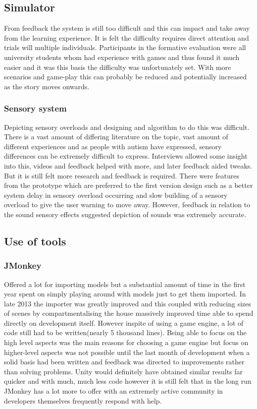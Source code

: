 \subsection{Simulator}
From feedback the system is still too difficult and this can impact and take away from the learning experience. It is felt the difficulty requires direct attention and trials will multiple individuals. Participants in the formative evaluation were all university students whom had experience with games and thus found it much easier and it was this basis the difficulty was unfortunately set. With more scenarios and game-play this can probably be reduced and potentially increased as the story moves onwards.
 
\subsubsection{Sensory system}
Depicting sensory overloads and designing and algorithm to do this was difficult. There is a vast amount of differing literature on the topic, vast amount of different experiences and as people with autism have expressed, sensory differences can be extremely difficult to express. Interviews allowed some insight into this, videos and feedback helped with more, and later feedback aided tweaks. But it is still felt more research and feedback is required. There were features from the prototype which are preferred to the first version design such as a better system delay in sensory overload occurring and slow building of a sensory overload to give the user warning to move away. However, feedback in relation to the sound sensory effects suggested depiction of sounds was extremely accurate. 


\subsection{Use of tools}

\subsubsection{JMonkey}
Offered a lot for importing models but a substantial amount of time in the first year spent on simply playing around with models just to get them imported. In late 2013 the importer was greatly improved and this coupled with reducing sizes of scenes by compartmentalising the house massively improved time able to spend directly on development itself.
However inspite of using a game engine, a lot of code still had to be written(nearly 5 thousand lines). Being able to focus on the high level aspects was the main reasons for choosing a game engine but focus on higher-level aspects was not possible until the last month of development when a solid basis had been written and feedback was directed to improvements rather than solving problems.
Unity would definitely have obtained similar results far quicker and with much, much less code however it is still felt that in the long run JMonkey has a lot more to offer with an extremely active community in developers themselves frequently respond with help.


